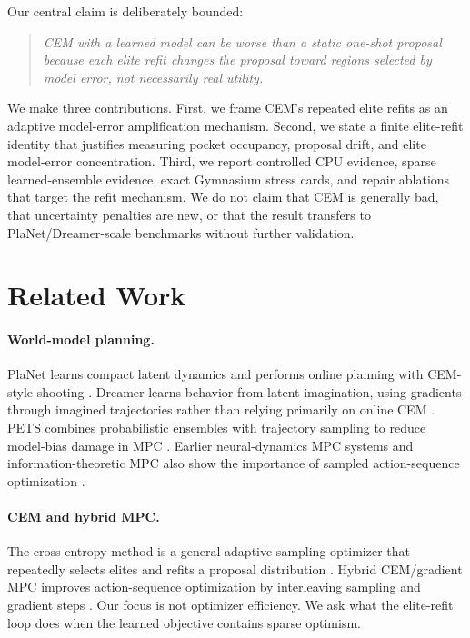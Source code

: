 \documentclass{article}
\begin{document}
Our central claim is deliberately bounded:
\begin{quote}
\emph{CEM with a learned model can be worse than a static one-shot proposal because each elite refit changes the proposal toward regions selected by model error, not necessarily real utility.}
\end{quote}
We make three contributions. First, we frame CEM's repeated elite refits as an adaptive model-error amplification mechanism. Second, we state a finite elite-refit identity that justifies measuring pocket occupancy, proposal drift, and elite model-error concentration. Third, we report controlled CPU evidence, sparse learned-ensemble evidence, exact Gymnasium stress cards, and repair ablations that target the refit mechanism. We do not claim that CEM is generally bad, that uncertainty penalties are new, or that the result transfers to PlaNet/Dreamer-scale benchmarks without further validation.

\section{Related Work}

\paragraph{World-model planning.}
PlaNet learns compact latent dynamics and performs online planning with CEM-style shooting \citep{hafner2019planet}. Dreamer learns behavior from latent imagination, using gradients through imagined trajectories rather than relying primarily on online CEM \citep{hafner2020dreamer}. PETS combines probabilistic ensembles with trajectory sampling to reduce model-bias damage in MPC \citep{chua2018pets}. Earlier neural-dynamics MPC systems and information-theoretic MPC also show the importance of sampled action-sequence optimization \citep{nagabandi2018neural,williams2017information}.

\paragraph{CEM and hybrid MPC.}
The cross-entropy method is a general adaptive sampling optimizer that repeatedly selects elites and refits a proposal distribution \citep{rubinstein1999cem,deboer2005tutorial}. Hybrid CEM/gradient MPC improves action-sequence optimization by interleaving sampling and gradient steps \citep{bharadhwaj2020mpc}. Our focus is not optimizer efficiency. We ask what the elite-refit loop does when the learned objective contains sparse optimism.
\end{document}
